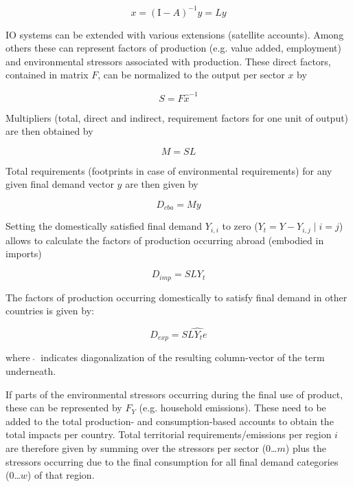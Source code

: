 \documentclass{jors}
\begin{document}
{\begin{equation}
    x = (\mathrm{I}- A)^{-1}y = Ly
\end{equation}


IO systems can be extended with various extensions (satellite accounts).
Among others these can represent factors of production (e.g. value added, employment)
and environmental stressors associated with production.
These direct factors, contained in matrix $F$, can be normalized to the output per sector $x$ by

\begin{equation}
    S = F\hat{x}^{-1}
\end{equation}

Multipliers (total, direct and indirect, requirement factors for one unit of output) are then obtained by

\begin{equation}
    M = SL
\end{equation}



Total requirements (footprints in case of environmental requirements) for any
given final demand vector $y$ are then given by 

\begin{equation}
    D_{cba} = My
\end{equation}

Setting the domestically satisfied final demand $Y_{i,i}$ to zero ($Y_{t} = Y -
Y_{i,j}\; |\; i = j$) allows to calculate the factors of production occurring
abroad (embodied in imports)

\begin{equation}
    D_{imp} = SLY_{t}
\end{equation}

The factors of production occurring domestically to satisfy final demand in
other countries is given by: 

\begin{equation}
    D_{exp} = S\widehat{LY_{t}e}
\end{equation}

where $\ \widehat{ }\ $ indicates diagonalization of the resulting column-vector of the term underneath.

If parts of the environmental stressors occurring during the final use of product,
these can be represented by $F_Y$ (e.g. household emissions). 
These need to be added to the total production- and consumption-based accounts to obtain the total impacts per country. 
Total territorial requirements/emissions per region $i$ are therefore given by summing over the stressors per sector (0\ldots$m$) 
plus the stressors occurring due to the final consumption for all final demand categories (0\ldots$w$) of that region.

}
\end{document}
